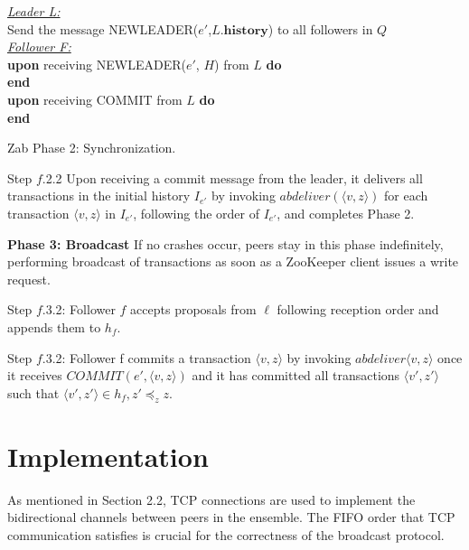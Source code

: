 \documentclass[10pt,onecolumn]{article}
\begin{document}
\begin{algorithm}[H]
  \SetAlgoNoLine
  \textit{\underline{Leader L:}} \\
  Send the message NEWLEADER($e'$,$L.\mathbf{history}$) to all followers in $Q$ \\
  \textit{\underline{Follower F:}} \\
  \textbf{upon} receiving NEWLEADER($e'$, $H$) from $L$ \textbf{do} \\
    \Indp
  \Indm
  \textbf{end} \\
  \textbf{upon} receiving COMMIT from $L$ \textbf{do} \\
    \Indp
  \Indm
  \textbf{end}
\caption{Zab Phase 2: Synchronization.}
\label{alg:phase2}
\end{algorithm}

Step $f$.2.2 Upon receiving a commit message from the leader, it delivers all transactions in the initial history $I_{e'}$ by invoking $abdeliver(\langle v,z \rangle)$ for each transaction $\langle v,z \rangle$ in $I_{e'}$, following the order of $I_{e'}$, and completes Phase 2.

\textbf{Phase 3: Broadcast} If no crashes occur, peers stay in this phase indefinitely, performing broadcast of transactions as soon as a ZooKeeper client issues a write request.

Step $f$.3.2: Follower $f$ accepts proposals from $\ell$ following reception order and appends them to $h_f$.

Step $f$.3.2: Follower f commits a transaction $\langle v,z \rangle$ by invoking $abdeliver \langle v,z \rangle$ once it receives $COMMIT(e',\langle v,z \rangle)$ and it has committed all transactions $\langle v',z' \rangle$ such that $\langle v', z' \rangle \in h_f, z' \preceq_{z} z$.

\section{Implementation} \label{sec:impl}

As mentioned in Section 2.2, TCP connections are used to implement the bidirectional channels between peers in the ensemble. The FIFO order that TCP communication satisfies is crucial for the correctness of the broadcast protocol.



\end{document}
